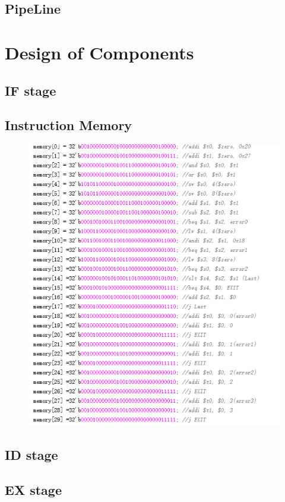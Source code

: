 \documentclass[12pt]{article}
\begin{document}
\subsection{PipeLine}
\section{Design of Components}
\subsection{IF stage}
\subsection{Instruction Memory}
\begin{figure}[H]
\centering
\includegraphics[scale=1]{Instruction.jpg}
\end{figure}
\subsection{ID stage}
\subsection{EX stage}
\end{document}
